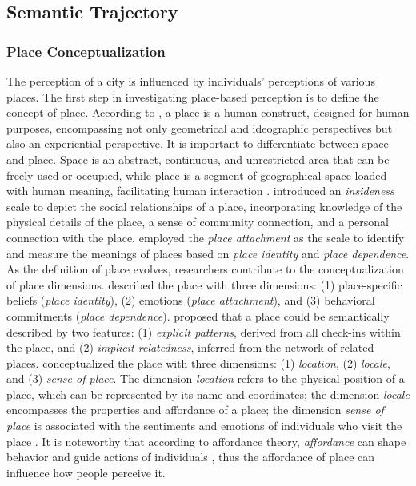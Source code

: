 \documentclass{article}
\theoremstyle{remark}
\begin{document}
\subsection{Semantic Trajectory} \label{semantic_trajectory}

\subsubsection{Place Conceptualization}

The perception of a city is influenced by individuals' perceptions of various places. The first step in investigating place-based perception is to define the concept of place. According to \cite{tuan_place_1975}, a place is a human construct, designed for human purposes, encompassing not only geometrical and ideographic perspectives but also an experiential perspective. It is important to differentiate between space and place. Space is an abstract, continuous, and unrestricted area that can be freely used or occupied, while place is a segment of geographical space loaded with human meaning, facilitating human interaction \citep{tuan_place_1975, agnew_space_2011, cresswell_place_2014}. \cite{relph_place_1976} introduced an \textit{insideness} scale to depict the social relationships of a place, incorporating knowledge of the physical details of the place, a sense of community connection, and a personal connection with the place. \cite{williams_measurement_2003} employed the \textit{place attachment} as the scale to identify and measure the meanings of places based on \textit{place identity} and \textit{place dependence}. As the definition of place evolves, researchers contribute to the conceptualization of place dimensions. \cite{jorgensen_comparative_2006} described the place with three dimensions: (1) place-specific beliefs (\textit{place identity}), (2) emotions (\textit{place attachment}), and (3) behavioral commitments (\textit{place dependence}). \cite{ye_semantic_2011} proposed that a place could be semantically described by two features: (1) \textit{explicit patterns}, derived from all check-ins within the place, and (2) \textit{implicit relatedness}, inferred from the network of related places. \cite{agnew_space_2011} conceptualized the place with three dimensions: (1) \textit{location}, (2) \textit{locale}, and (3) \textit{sense of place}. The dimension \textit{location} refers to the physical position of a place, which can be represented by its name and coordinates; the dimension \textit{locale} encompasses the properties and affordance of a place; the dimension \textit{sense of place} is associated with the sentiments and emotions of individuals who visit the place \citep{bahrehdar_description_2018}. It is noteworthy that according to affordance theory, \textit{affordance} can shape behavior and guide actions of individuals \citep{gibson_theory_1977}, thus the affordance of place can influence how people perceive it.
\end{document}
